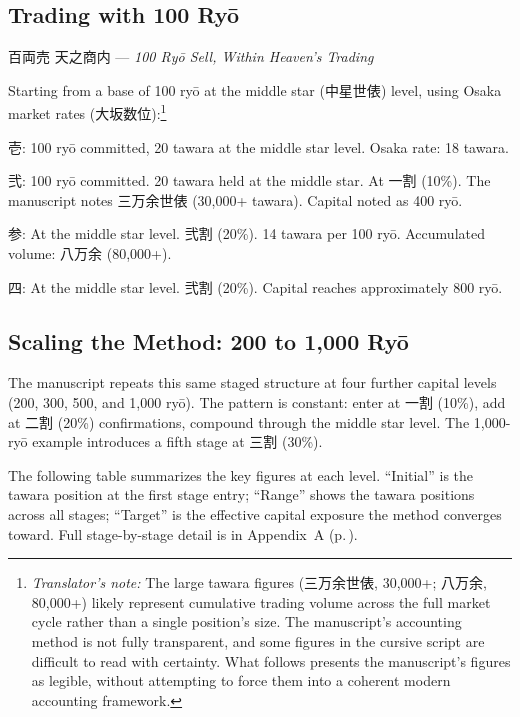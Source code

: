 \documentclass[10pt, openany]{book}
\newcommand{\jp}[1]{{\japanesefont #1}}
\newcommand{\tn}[1]{\footnote{\textit{Translator's note:} #1}}
\begin{document}
\subsection{Trading with 100 Ry\=o}

\begin{center}
\jp{百両売 天之商内} --- \textit{100 Ry\=o Sell, Within Heaven's Trading}
\end{center}

\vspace{0.5em}

Starting from a base of 100 ry\=o at the middle star (\jp{中星世俵})
level, using Osaka market rates (\jp{大坂数位}):\tn{The large tawara
figures (\jp{三万余世俵}, 30,000+; \jp{八万余}, 80,000+) likely
represent cumulative trading volume across the full market cycle rather
than a single position's size. The manuscript's accounting method is
not fully transparent, and some figures in the cursive script are
difficult to read with certainty. What follows presents the
manuscript's figures as legible, without attempting to force them into
a coherent modern accounting framework.}

\jp{壱}: 100 ry\=o committed, 20 tawara at the middle star level.
Osaka rate: 18 tawara.

\jp{弐}: 100 ry\=o committed. 20 tawara held at the middle star.
At \jp{一割} (10\%). The manuscript notes \jp{三万余世俵} (30,000+
tawara). Capital noted as 400 ry\=o.

\jp{参}: At the middle star level. \jp{弐割} (20\%). 14 tawara per
100 ry\=o. Accumulated volume: \jp{八万余} (80,000+).

\jp{四}: At the middle star level. \jp{弐割} (20\%). Capital reaches
approximately 800 ry\=o.

\subsection{Scaling the Method: 200 to 1,000 Ry\=o}

The manuscript repeats this same staged structure at four further capital
levels (200, 300, 500, and 1,000 ry\=o). The pattern is constant:
enter at \jp{一割} (10\%), add at \jp{二割} (20\%) confirmations,
compound through the middle star level. The 1,000-ry\=o example
introduces a fifth stage at \jp{三割} (30\%).

The following table summarizes the key figures at each level.
``Initial'' is the tawara position at the first stage entry; ``Range''
shows the tawara positions across all stages; ``Target'' is the
effective capital exposure the method converges toward. Full
stage-by-stage detail is in Appendix~A (p.\,\pageref{app:calctables}).
\end{document}
